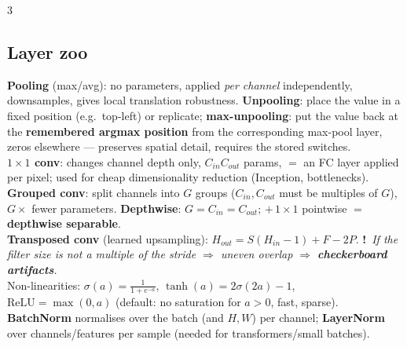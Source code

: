 \documentclass[9pt,a4paper,landscape]{extarticle}
\newcommand{\key}[1]{\textbf{#1}}
\newcommand{\tr}[1]{{\color{trap}\textbf{!}}\ \textit{#1}}
\begin{document}
\begin{multicols}{3}
\subsection{Layer zoo}
\key{Pooling} (max/avg): no parameters, applied \emph{per channel} independently, downsamples, gives local translation robustness. \key{Unpooling}: place the value in a fixed position (e.g.\ top-left) or replicate; \key{max-unpooling}: put the value back at the \key{remembered argmax position} from the corresponding max-pool layer, zeros elsewhere --- preserves spatial detail, requires the stored switches.\\
\key{$1\times1$ conv}: changes channel depth only, $C_{in}C_{out}$ params, $=$ an FC layer applied per pixel; used for cheap dimensionality reduction (Inception, bottlenecks).\\
\key{Grouped conv}: split channels into $G$ groups ($C_{in},C_{out}$ must be multiples of $G$), $G\times$ fewer parameters. \key{Depthwise}: $G=C_{in}=C_{out}$; $+\,1\times1$ pointwise $=$ \key{depthwise separable}.\\
\key{Transposed conv} (learned upsampling): $H_{out}=S(H_{in}-1)+F-2P$. \tr{If the filter size is not a multiple of the stride $\Rightarrow$ uneven overlap $\Rightarrow$ \key{checkerboard artifacts}.}\\
Non-linearities: $\sigma(a)=\frac1{1+e^{-a}}$, $\tanh(a)=2\sigma(2a)-1$, $\mathrm{ReLU}=\max(0,a)$ (default: no saturation for $a>0$, fast, sparse).\\
\key{BatchNorm} normalises over the batch (and $H,W$) per channel; \key{LayerNorm} over channels/features per sample (needed for transformers/small batches).


\end{multicols}
\end{document}

